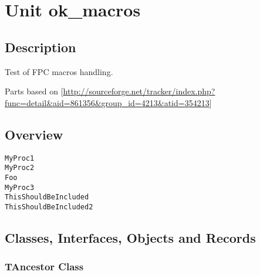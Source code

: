 \documentclass{report}
\newif\ifpdf
\begin{document}
\label{toc}\tableofcontents
\newpage
\newlength{\tmplength}
\chapter{Unit ok{\_}macros}
\label{ok_macros}
\section{Description}
Test of FPC macros handling.\hfill\vspace*{1ex}



Parts based on [\href{http://sourceforge.net/tracker/index.php?func=detail&aid=861356&group_id=4213&atid=354213}{http://sourceforge.net/tracker/index.php?func=detail{\&}aid=861356{\&}group{\_}id=4213{\&}atid=354213}]
\section{Overview}
\begin{description}
\item[\texttt{\begin{ttfamily}TAncestor\end{ttfamily} Class}]
\item[\texttt{\begin{ttfamily}TMyClass\end{ttfamily} Class}]
\end{description}
\begin{description}
\item[\texttt{MyProc1}]
\item[\texttt{MyProc2}]
\item[\texttt{Foo}]
\item[\texttt{MyProc3}]
\item[\texttt{ThisShouldBeIncluded}]
\item[\texttt{ThisShouldBeIncluded2}]
\end{description}
\section{Classes, Interfaces, Objects and Records}
\ifpdf
\subsection*{\large{\textbf{TAncestor Class}}\normalsize\hspace{1ex}\hrulefill}
\else
\subsection*{TAncestor Class}
\fi
\label{ok_macros.TAncestor}
\end{document}
